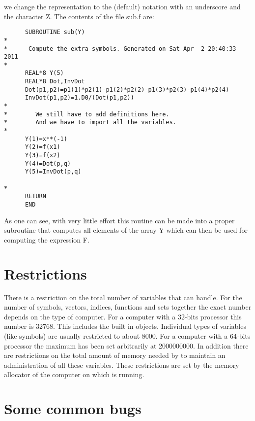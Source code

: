 we change the representation to the (default) notation with an underscore 
and the character Z. The contents of the file sub.f are:
\begin{verbatim}
      SUBROUTINE sub(Y)
*
*      Compute the extra symbols. Generated on Sat Apr  2 20:40:33 2011
*
      REAL*8 Y(5)
      REAL*8 Dot,InvDot
      Dot(p1,p2)=p1(1)*p2(1)-p1(2)*p2(2)-p1(3)*p2(3)-p1(4)*p2(4)
      InvDot(p1,p2)=1.D0/(Dot(p1,p2))
*
*        We still have to add definitions here.
*        And we have to import all the variables.
*
      Y(1)=x**(-1)
      Y(2)=f(x1)
      Y(3)=f(x2)
      Y(4)=Dot(p,q)
      Y(5)=InvDot(p,q)

*
      RETURN
      END
\end{verbatim}
As one can see, with very little effort this routine can be made into a 
proper subroutine that computes all elements of the array Y which can then 
be used for computing the expression F.


\section{Restrictions}

There is a restriction on the total number of 
variables that {\FORM} can handle. For the 
number of symbols, vectors, indices, functions and sets together the exact 
number depends on the type of computer. For a computer with a 32-bits 
processor this number is 32768. This includes the built in objects. 
Individual types of variables (like symbols) are usually restricted to 
about 8000. For a 
computer with a 64-bits processor the maximum has been set arbitrarily at 
2000000000. In addition there are restrictions on the total amount of 
memory needed by {\FORM} to maintain an 
administration of all these variables. These restrictions are set by the 
memory allocator of the computer on which {\FORM} is running.

\section{Some common bugs}

